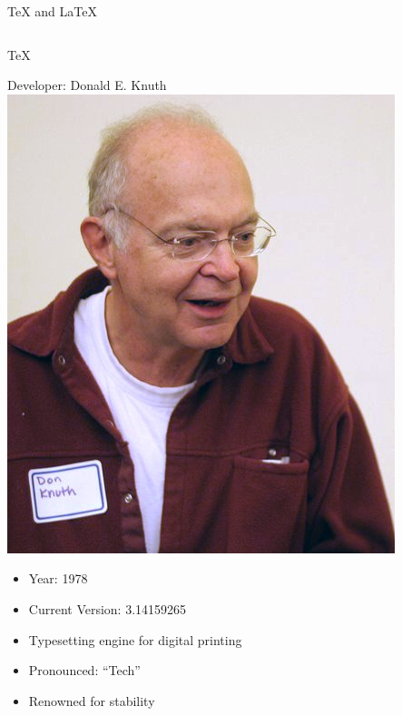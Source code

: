 \documentclass{beamer}
\begin{document}
\begin{frame}{\TeX{} and \LaTeX}
 \begin{columns}[t]
  
  \begin{center}
    {\large \TeX}
    \begin{block}{Developer: Donald E. Knuth}
     \centering
     \includegraphics[height=0.2\textheight]{pics/Knuth.jpg}
    \end{block}
    {\tiny
    \begin{itemize}
    \item Year: 1978
    \item Current Version: 3.14159265
    \item Typesetting engine for digital printing
    \item Pronounced: ``Tech''
    \item Renowned for stability
    \end{itemize}
    }
  \end{center}
  
  \pause
  

\end{columns}
\end{frame}
\end{document}
